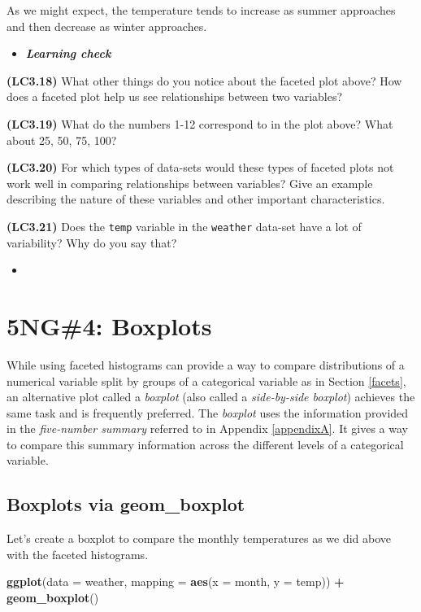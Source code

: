 \documentclass[12pt,]{krantz}
\makeatletter
\newenvironment{Shaded}{\begin{snugshade}}{\end{snugshade}}
\newcommand{\KeywordTok}[1]{\textcolor[rgb]{0.27,0.27,0.27}{\textbf{#1}}}
\newcommand{\DataTypeTok}[1]{\textcolor[rgb]{0.27,0.27,0.27}{#1}}
\newcommand{\StringTok}[1]{\textcolor[rgb]{0.5,0.5,0.5}{#1}}
\newcommand{\OperatorTok}[1]{\textcolor[rgb]{0.43,0.43,0.43}{\textbf{#1}}}
\newcommand{\NormalTok}[1]{#1}
\newenvironment{kframe}{%
\medskip{}
\setlength{\fboxsep}{.8em}
 \def\at@end@of@kframe{}%
 \ifinner\ifhmode%
  \def\at@end@of@kframe{\end{minipage}}%
  \begin{minipage}{\columnwidth}%
 \fi\fi%
 \def\FrameCommand##1{\hskip\@totalleftmargin \hskip-\fboxsep
 \colorbox{shadecolor}{##1}\hskip-\fboxsep
     \hskip-\linewidth \hskip-\@totalleftmargin \hskip\columnwidth}%
 \MakeFramed {\advance\hsize-\width
   \@totalleftmargin\z@ \linewidth\hsize
   \@setminipage}}%
 {\par\unskip\endMakeFramed%
 \at@end@of@kframe}
\renewenvironment{Shaded}{\begin{kframe}}{\end{kframe}}
\newenvironment{rmdblock}[1]
  {\begin{shaded*}
  \begin{itemize}
  \renewcommand{\labelitemi}{
    \raisebox{-.7\height}[0pt][0pt]{
    }
  }
  \item
  }
  {
  \end{itemize}
  \end{shaded*}
  }
\newenvironment{learncheck}
  {\begin{rmdblock}{warning}}
  {\end{rmdblock}}
\makeatother
\begin{document}
As we might expect, the temperature tends to increase as summer
approaches and then decrease as winter approaches.

\begin{learncheck}
\textbf{\emph{Learning check}}
\end{learncheck}

\textbf{(LC3.18)} What other things do you notice about the faceted plot
above? How does a faceted plot help us see relationships between two
variables?

\textbf{(LC3.19)} What do the numbers 1-12 correspond to in the plot
above? What about 25, 50, 75, 100?

\textbf{(LC3.20)} For which types of data-sets would these types of
faceted plots not work well in comparing relationships between
variables? Give an example describing the nature of these variables and
other important characteristics.

\textbf{(LC3.21)} Does the \texttt{temp} variable in the
\texttt{weather} data-set have a lot of variability? Why do you say
that?

\begin{learncheck}

\end{learncheck}

\section{5NG\#4: Boxplots}\label{boxplots}

While using faceted histograms can provide a way to compare
distributions of a numerical variable split by groups of a categorical
variable as in Section \ref{facets}, an alternative plot called a
\emph{boxplot} (also called a \emph{side-by-side boxplot}) achieves the
same task and is frequently preferred. The \emph{boxplot} uses the
information provided in the \emph{five-number summary} referred to in
Appendix \ref{appendixA}. It gives a way to compare this summary
information across the different levels of a categorical variable.

\subsection{Boxplots via geom\_boxplot}\label{geomboxplot}

Let's create a boxplot to compare the monthly temperatures as we did
above with the faceted histograms.

\begin{Shaded}
\begin{Highlighting}[]
\KeywordTok{ggplot}\NormalTok{(}\DataTypeTok{data =}\NormalTok{ weather, }\DataTypeTok{mapping =} \KeywordTok{aes}\NormalTok{(}\DataTypeTok{x =}\NormalTok{ month, }\DataTypeTok{y =}\NormalTok{ temp)) }\OperatorTok{+}
\StringTok{  }\KeywordTok{geom_boxplot}\NormalTok{()}
\end{Highlighting}
\end{Shaded}
\end{document}
